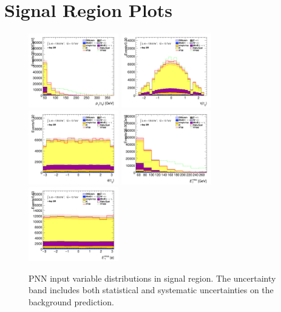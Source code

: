		\clearpage
	\section{\taulep Signal Region Plots}\label{sec:taulep-sr-plots}
		\begin{figure}[!htp]
			\begin{center}    
			\includegraphics[width=0.35\textwidth]{chapters/chapter6_HPlus/images/taulep/tau_0_pt_SR_TAULEP.png}
			\includegraphics[width=0.35\textwidth]{chapters/chapter6_HPlus/images/taulep/tau_0_eta_SR_TAULEP.png} \\
			\includegraphics[width=0.35\textwidth]{chapters/chapter6_HPlus/images/taulep/tau_0_phi_SR_TAULEP.png}
			\includegraphics[width=0.35\textwidth]{chapters/chapter6_HPlus/images/taulep/met_et_SR_TAULEP.png} \\
			\includegraphics[width=0.35\textwidth]{chapters/chapter6_HPlus/images/taulep/met_phi_SR_TAULEP.png} 
			\end{center}
			\caption{
			PNN input variable distributions in \taulep signal region. The uncertainty band includes both statistical and systematic uncertainties on the background prediction. 
			}
			\label{fig:sr-taulep-1}
		\end{figure}

